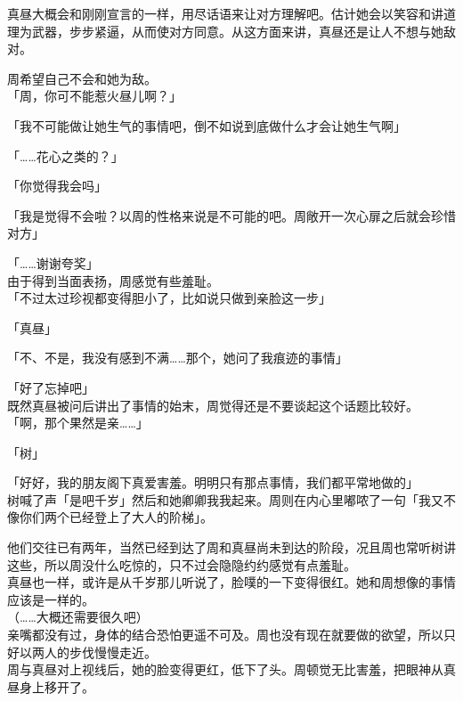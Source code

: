 真昼大概会和刚刚宣言的一样，用尽话语来让对方理解吧。估计她会以笑容和讲道理为武器，步步紧逼，从而使对方同意。从这方面来讲，真昼还是让人不想与她敌对。

周希望自己不会和她为敌。\\

「周，你可不能惹火昼儿啊？」

「我不可能做让她生气的事情吧，倒不如说到底做什么才会让她生气啊」

「……花心之类的？」

「你觉得我会吗」

「我是觉得不会啦？以周的性格来说是不可能的吧。周敞开一次心扉之后就会珍惜对方」

「……谢谢夸奖」\\

由于得到当面表扬，周感觉有些羞耻。\\

「不过太过珍视都变得胆小了，比如说只做到亲脸这一步」

「真昼」

「不、不是，我没有感到不满……那个，她问了我痕迹的事情」

「好了忘掉吧」\\

既然真昼被问后讲出了事情的始末，周觉得还是不要谈起这个话题比较好。\\

「啊，那个果然是亲……」

「树」

「好好，我的朋友阁下真爱害羞。明明只有那点事情，我们都平常地做的」\\

树喊了声「是吧千岁」然后和她卿卿我我起来。周则在内心里嘟哝了一句「我又不像你们两个已经登上了大人的阶梯」。

他们交往已有两年，当然已经到达了周和真昼尚未到达的阶段，况且周也常听树讲这些，所以周没什么吃惊的，只不过会隐隐约约感觉有点羞耻。\\

真昼也一样，或许是从千岁那儿听说了，脸噗的一下变得很红。她和周想像的事情应该是一样的。\\

（……大概还需要很久吧）\\

亲嘴都没有过，身体的结合恐怕更遥不可及。周也没有现在就要做的欲望，所以只好以两人的步伐慢慢走近。\\

周与真昼对上视线后，她的脸变得更红，低下了头。周顿觉无比害羞，把眼神从真昼身上移开了。
